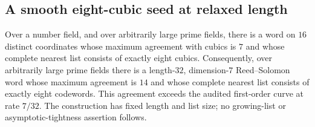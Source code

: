 \subsection{A smooth eight-cubic seed at relaxed length}
\label{app:eight-cubic-smooth-seed}

\begin{theorem}
\label{thm:eight-cubic-smooth-seed}
Over a number field, and over arbitrarily large prime fields, there is a
word on $16$ distinct coordinates whose maximum agreement with cubics is
$7$ and whose complete nearest list consists of exactly eight cubics.
Consequently, over arbitrarily large prime fields there is a length-$32$,
dimension-$7$ Reed--Solomon word whose maximum agreement is $14$ and
whose complete nearest list consists of exactly eight codewords. This agreement exceeds the audited
first-order curve at rate $7/32$. The construction has fixed length and
list size; no growing-list or asymptotic-tightness assertion follows.
\end{theorem}

